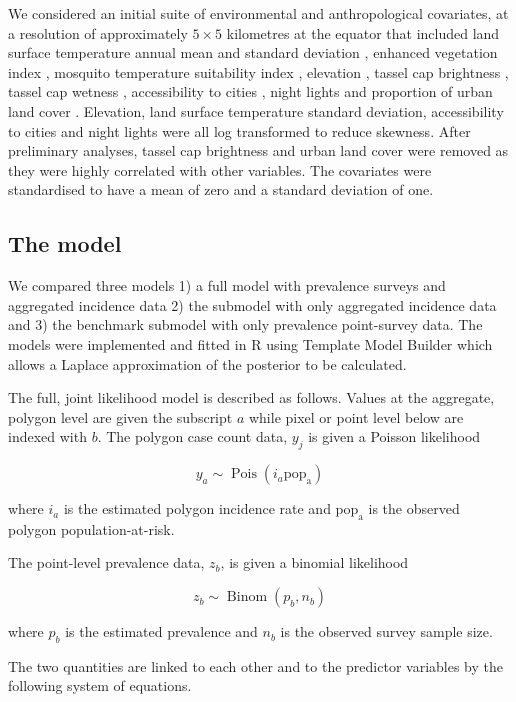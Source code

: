 \documentclass[10pt,letterpaper]{article}
\begin{document}
We considered an initial suite of environmental and anthropological covariates, at a resolution of approximately $5 \times 5$ kilometres at the equator that included land surface temperature annual mean and standard deviation \cite{LST}, enhanced vegetation index \cite{TCB}, mosquito temperature suitability index \cite{weiss2014air}, elevation \cite{SRTMElev}, tassel cap brightness \cite{TCB}, tassel cap wetness \cite{TCB}, accessibility to cities \cite{weiss2018global}, night lights \cite{} and proportion of urban land cover \cite{}.
Elevation, land surface temperature standard deviation, accessibility to cities and night lights were all log transformed to reduce skewness.
After preliminary analyses, tassel cap brightness and urban land cover were removed as they were highly correlated with other variables.
The covariates were standardised to have a mean of zero and a standard deviation of one.

\subsection*{The model}

We compared three models 1) a full model with prevalence surveys and aggregated incidence data 2) the submodel with only aggregated incidence data and 3) the benchmark submodel with only prevalence point-survey data. 
The models were implemented and fitted in R \cite{R} using Template Model Builder \cite{TMB} which allows a Laplace approximation of the posterior to be calculated.

The full, joint likelihood model is described as follows. 
Values at the aggregate, polygon level are given the subscript $a$ while pixel or point level below are indexed with $b$.
The polygon case count data, $y_j$ is given a Poisson likelihood

$$y_a \sim \operatorname{Pois}(i_a\mathrm{pop_a})$$

where $i_a$ is the estimated polygon incidence rate and $\mathrm{pop_a}$ is the observed polygon population-at-risk.

The point-level prevalence data, $z_b$, is given a binomial likelihood

$$z_b \sim \operatorname{Binom}(p_b, n_b) $$

where $p_b$ is the estimated prevalence and $n_b$ is the observed survey sample size. 

The two quantities are linked to each other and to the predictor variables by the following system of equations.
\end{document}
